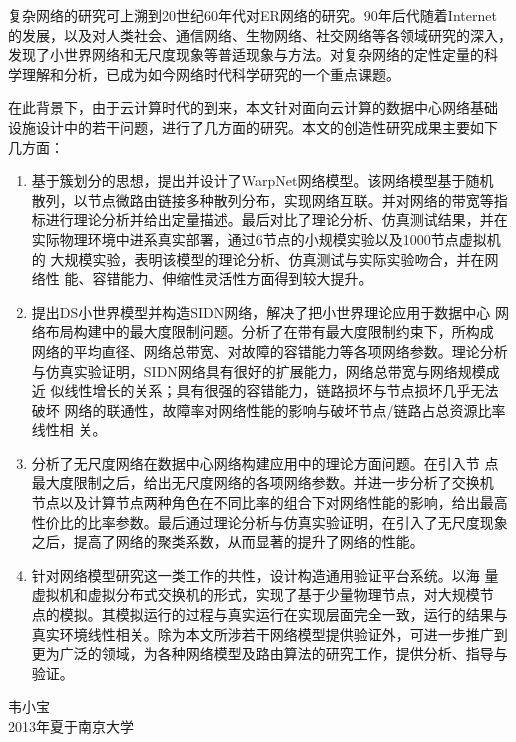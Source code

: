 \documentclass[phd]{jnuthesis}
\begin{document}
\begin{preface}
复杂网络的研究可上溯到20世纪60年代对ER网络的研究。90年后代随着Internet
的发展，以及对人类社会、通信网络、生物网络、社交网络等各领域研究的深入，
发现了小世界网络和无尺度现象等普适现象与方法。对复杂网络的定性定量的科
学理解和分析，已成为如今网络时代科学研究的一个重点课题。

在此背景下，由于云计算时代的到来，本文针对面向云计算的数据中心网络基础
设施设计中的若干问题，进行了几方面的研究。本文的创造性研究成果主要如下
几方面：

\begin{enumerate}
\item 基于簇划分的思想，提出并设计了WarpNet网络模型。该网络模型基于随机
  散列，以节点微路由链接多种散列分布，实现网络互联。并对网络的带宽等指
  标进行理论分析并给出定量描述。最后对比了理论分析、仿真测试结果，并在
  实际物理环境中进系真实部署，通过6节点的小规模实验以及1000节点虚拟机的
  大规模实验，表明该模型的理论分析、仿真测试与实际实验吻合，并在网络性
  能、容错能力、伸缩性灵活性方面得到较大提升。
\item 提出DS小世界模型并构造SIDN网络，解决了把小世界理论应用于数据中心
  网络布局构建中的最大度限制问题。分析了在带有最大度限制约束下，所构成
  网络的平均直径、网络总带宽、对故障的容错能力等各项网络参数。理论分析
  与仿真实验证明，SIDN网络具有很好的扩展能力，网络总带宽与网络规模成近
  似线性增长的关系；具有很强的容错能力，链路损坏与节点损坏几乎无法破坏
  网络的联通性，故障率对网络性能的影响与破坏节点/链路占总资源比率线性相
  关。
\item 分析了无尺度网络在数据中心网络构建应用中的理论方面问题。在引入节
  点最大度限制之后，给出无尺度网络的各项网络参数。并进一步分析了交换机
  节点以及计算节点两种角色在不同比率的组合下对网络性能的影响，给出最高
  性价比的比率参数。最后通过理论分析与仿真实验证明，在引入了无尺度现象
  之后，提高了网络的聚类系数，从而显著的提升了网络的性能。

\item 针对网络模型研究这一类工作的共性，设计构造通用验证平台系统。以海
  量虚拟机和虚拟分布式交换机的形式，实现了基于少量物理节点，对大规模节
  点的模拟。其模拟运行的过程与真实运行在实现层面完全一致，运行的结果与
  真实环境线性相关。除为本文所涉若干网络模型提供验证外，可进一步推广到
  更为广泛的领域，为各种网络模型及路由算法的研究工作，提供分析、指导与
  验证。
\end{enumerate}

\vspace{1cm}
\begin{flushright}
韦小宝\\
2013年夏于南京大学
\end{flushright}

\end{preface}
\end{document}
